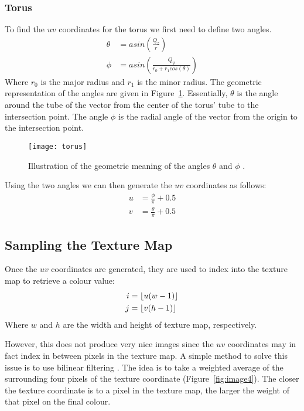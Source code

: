 \subsubsection*{Torus}
To find the $uv$ coordinates for the torus we first need to define two angles.
\begin{equation}
\begin{split}
  \theta &= asin(\frac{Q_{z}}{r}) \\
  \phi &= asin(\frac{Q_{y}}{r_{0} + r_{1}cos(\theta)})
\end{split}
\end{equation}
Where $r_{0}$ is the major radius and $r_{1}$ is the minor radius. The geometric
representation of the angles are given in Figure~\ref{fig:image3}. Essentially,
$\theta$ is the angle around the tube of the vector from the center of the 
torus' tube to the intersection point. The angle $\phi$ is the radial angle of
the vector from the origin to the intersection point.

\begin{figure}[ht]
  \texttt{[image: torus]}
  \caption{Illustration of the geometric meaning of the angles $\theta$ and 
  $\phi$ \cite{3_bourke_1990}.}
  \label{fig:image3}
\end{figure}

Using the two angles we can then generate the $uv$ coordinates as follows:
\begin{equation}
\begin{split}
  u &= \frac{\phi}{\pi} + 0.5 \\
  v &= \frac{\theta}{\pi} + 0.5
\end{split}
\end{equation}

\subsection{Sampling the Texture Map}
Once the $uv$ coordinates are generated, they are used to index into the texture
map to retrieve a colour value:
\begin{equation}
\begin{split}
  i &= \floor*{u(w - 1)} \\
  j &= \floor*{v(h - 1)}
\end{split}
\end{equation}
Where $w$ and $h$ are the width and height of texture map, respectively.

However, this does not produce very nice images since the $uv$ coordinates may
in fact index in between pixels in the texture map. A simple method to solve
this issue is to use bilinear filtering \cite{2_blinn_newell_1976}. The idea is 
to take a weighted average of the surrounding four pixels of the texture 
coordinate (Figure~\ref{fig:image4}). The closer the texture coordinate is to a 
pixel in the texture map, the larger the weight of that pixel on the final 
colour.

